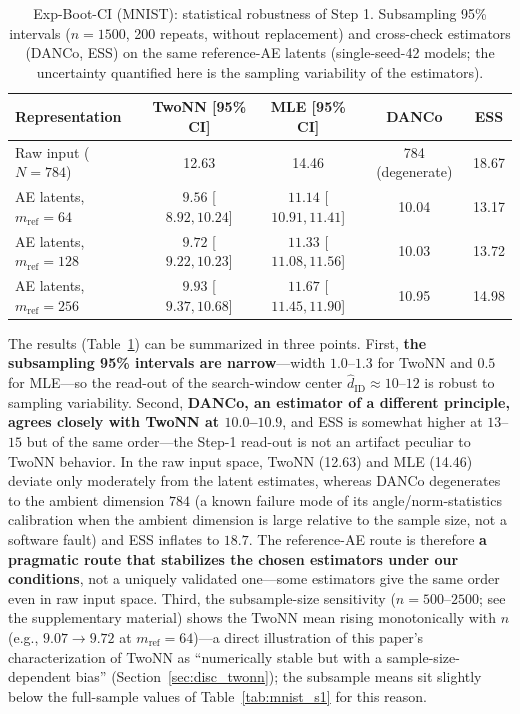 \documentclass[make,article,submit,pdftex,moreauthors]{Definitions/mdpi}
\newcommand{\hatdID}{\hat{d}_{\mathrm{ID}}}
\begin{document}
\begin{table}[H]
\caption{Exp-Boot-CI (MNIST): statistical robustness of Step 1.
Subsampling 95\% intervals ($n = 1500$, 200 repeats, without replacement)
and cross-check estimators (DANCo, ESS) on the same reference-AE latents
(single-seed-42 models; the uncertainty quantified here is the sampling
variability of the estimators).}
\label{tab:boot_ci}
\small
\begin{tabular}{lcccc}
\toprule
\textbf{Representation} & \textbf{TwoNN [95\% CI]} & \textbf{MLE [95\% CI]} & \textbf{DANCo} & \textbf{ESS} \\
\midrule
Raw input ($N = 784$) & 12.63 & 14.46 & 784 (degenerate) & 18.67 \\
\midrule
AE latents, $m_{\mathrm{ref}} = 64$  & $9.56$ [$8.92, 10.24$] & $11.14$ [$10.91, 11.41$] & 10.04 & 13.17 \\
AE latents, $m_{\mathrm{ref}} = 128$ & $9.72$ [$9.22, 10.23$] & $11.33$ [$11.08, 11.56$] & 10.03 & 13.72 \\
AE latents, $m_{\mathrm{ref}} = 256$ & $9.93$ [$9.37, 10.68$] & $11.67$ [$11.45, 11.90$] & 10.95 & 14.98 \\
\bottomrule
\end{tabular}
\end{table}

The results (Table~\ref{tab:boot_ci}) can be summarized in three points.
First, \textbf{the subsampling 95\% intervals are narrow}---width
$1.0$--$1.3$ for TwoNN and $0.5$ for MLE---so the read-out of the
search-window center $\hatdID \approx 10$--$12$ is robust to sampling
variability.
Second, \textbf{DANCo, an estimator of a different principle, agrees
closely with TwoNN at $10.0$--$10.9$}, and ESS is somewhat higher at
$13$--$15$ but of the same order---the Step-1 read-out is not an artifact
peculiar to TwoNN behavior.
In the raw input space, TwoNN (12.63) and MLE (14.46) deviate only
moderately from the latent estimates, whereas DANCo degenerates to the
ambient dimension $784$ (a known failure mode of its angle/norm-statistics
calibration when the ambient dimension is large relative to the sample
size, not a software fault) and ESS inflates to $18.7$.
The reference-AE route is therefore \textbf{a pragmatic route that
stabilizes the chosen estimators under our conditions}, not a uniquely
validated one---some estimators give the same order even in raw input
space.
Third, the subsample-size sensitivity ($n = 500$--$2500$; see the
supplementary material) shows the TwoNN mean rising monotonically with $n$
(e.g., $9.07 \to 9.72$ at $m_{\mathrm{ref}} = 64$)---a direct illustration
of this paper's characterization of TwoNN as ``numerically stable but with
a sample-size-dependent bias'' (Section~\ref{sec:disc_twonn}); the
subsample means sit slightly below the full-sample values of
Table~\ref{tab:mnist_s1} for this reason.
\end{document}
